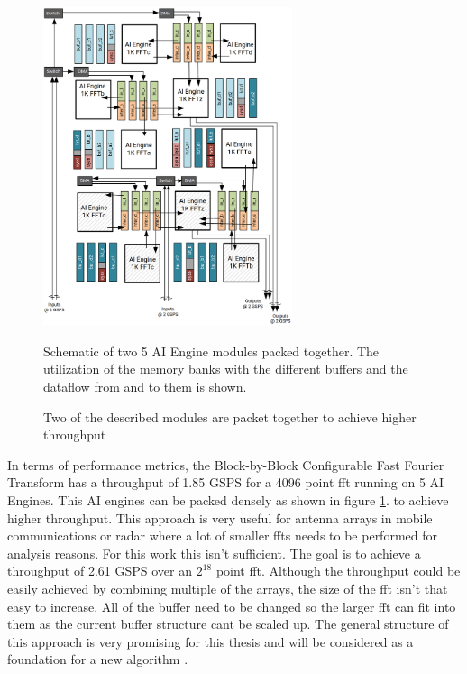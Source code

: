 \begin{figure}[h]
    \centering
    \includegraphics[width=0.65\textwidth]{images/packet_array.png}
    \captionsetup{justification=centering}
    \caption{Two of the described modules are packet together to achieve higher throughput \cite{block_by_block}}
            Schematic of two 5 AI Engine modules packed together. The utilization of the memory banks with the different buffers and the dataflow from and to them is shown.
    \label{fig:packet_array}
\end{figure}

In terms of performance metrics, the Block-by-Block Configurable Fast Fourier Transform has a throughput of 1.85 GSPS for a 4096 point \ac{fft} running on 5 AI Engines. This AI engines can be packed densely as shown in figure \ref{fig:packet_array}. to achieve higher throughput. This approach is very useful for antenna arrays in mobile communications or radar where a lot of smaller \ac{fft}s needs to be performed for analysis reasons. For this work this isn't sufficient. The goal is to achieve a throughput of 2.61 GSPS over an $2^{18}$ point \ac{fft}. Although the throughput could be easily achieved by combining multiple of the arrays, the size of the \ac{fft} isn't that easy to increase. All of the buffer need to be changed so the larger \ac{fft} can fit into them as the current buffer structure cant be scaled up. The general structure of this approach is very promising for this thesis and will be considered as a foundation for a new algorithm \cite{block_by_block}.


